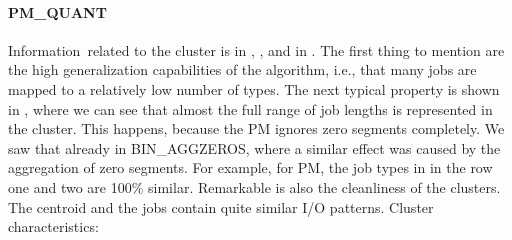 \documentclass[]{llncs}
\begin{document}
\paragraph{PM\_QUANT}
Information\ related to the cluster is in , , and in .
The first thing to mention are the high generalization capabilities of the algorithm, i.e., that many jobs are mapped to a relatively low number of types.
The next typical property is shown in , where we can see that almost the full range of job lengths is represented in the cluster.
This happens, because the PM ignores zero segments completely.
We saw that already in BIN\_AGGZEROS, where a similar effect was caused by the aggregation of zero segments.
For example, for PM, the job types in  in the row one and two are 100$\%$  similar.
Remarkable is also the cleanliness of the clusters.
The centroid and the jobs contain quite similar I/O patterns.
Cluster characteristics:
\end{document}
